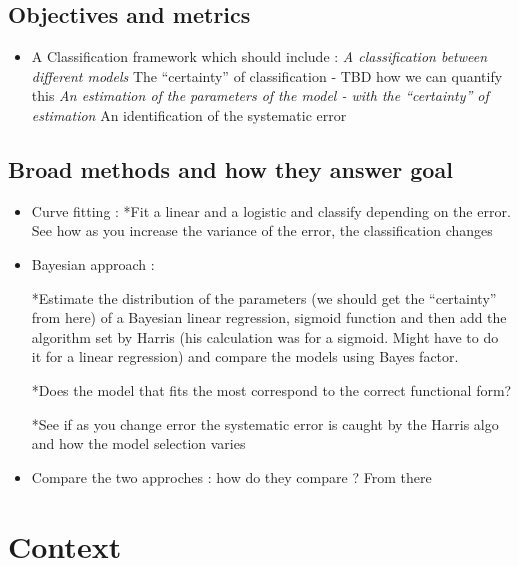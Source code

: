 \documentclass[]{article}
\providecommand{\tightlist}{%
  \setlength{\itemsep}{0pt}\setlength{\parskip}{0pt}}
\begin{document}
\hypertarget{objectives-and-metrics}{%
\subsection{Objectives and metrics}\label{objectives-and-metrics}}

\begin{itemize}
\tightlist
\item
  A Classification framework which should include : \emph{A
  classification between different models }The ``certainty'' of
  classification - TBD how we can quantify this \emph{An estimation of
  the parameters of the model - with the ``certainty'' of estimation }An
  identification of the systematic error
\end{itemize}

\hypertarget{broad-methods-and-how-they-answer-goal}{%
\subsection{Broad methods and how they answer
goal}\label{broad-methods-and-how-they-answer-goal}}

\begin{itemize}
\item
  Curve fitting : *Fit a linear and a logistic and classify depending on
  the error. See how as you increase the variance of the error, the
  classification changes
\item
  Bayesian approach :

  *Estimate the distribution of the parameters (we should get the
  ``certainty'' from here) of a Bayesian linear regression, sigmoid
  function and then add the algorithm set by Harris (his calculation was
  for a sigmoid. Might have to do it for a linear regression) and
  compare the models using Bayes factor.

  *Does the model that fits the most correspond to the correct
  functional form?

  *See if as you change error the systematic error is caught by the
  Harris algo and how the model selection varies
\item
  Compare the two approches : how do they compare ? From there
\end{itemize}

\hypertarget{context}{%
\section{Context}\label{context}}
\end{document}
